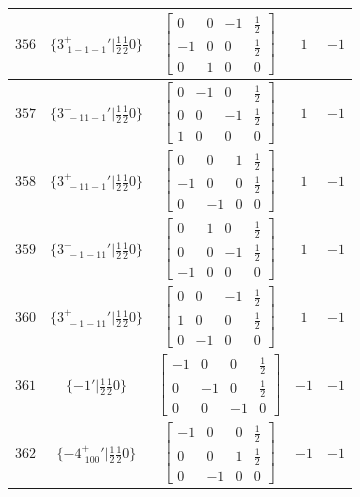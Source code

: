 \documentclass[fleqn,8pt]{jsarticle}
\begin{document}
\begin{longtable}{ccccc}
$ 356 $ & $ \{3^{+}_{\,\,1-1-1}{}'|\frac{1}{2} \frac{1}{2} 0\} $ & $ \begin{bmatrix} 0 & 0 & -1 & \frac{1}{2} \\ -1 & 0 & 0 & \frac{1}{2} \\ 0 & 1 & 0 & 0 \end{bmatrix} $ & $ 1 $ & $ -1 $ \\ \hline
$ 357 $ & $ \{3^{-}_{\,\,-11-1}{}'|\frac{1}{2} \frac{1}{2} 0\} $ & $ \begin{bmatrix} 0 & -1 & 0 & \frac{1}{2} \\ 0 & 0 & -1 & \frac{1}{2} \\ 1 & 0 & 0 & 0 \end{bmatrix} $ & $ 1 $ & $ -1 $ \\ \hline
$ 358 $ & $ \{3^{+}_{\,\,-11-1}{}'|\frac{1}{2} \frac{1}{2} 0\} $ & $ \begin{bmatrix} 0 & 0 & 1 & \frac{1}{2} \\ -1 & 0 & 0 & \frac{1}{2} \\ 0 & -1 & 0 & 0 \end{bmatrix} $ & $ 1 $ & $ -1 $ \\ \hline
$ 359 $ & $ \{3^{-}_{\,\,-1-11}{}'|\frac{1}{2} \frac{1}{2} 0\} $ & $ \begin{bmatrix} 0 & 1 & 0 & \frac{1}{2} \\ 0 & 0 & -1 & \frac{1}{2} \\ -1 & 0 & 0 & 0 \end{bmatrix} $ & $ 1 $ & $ -1 $ \\ \hline
$ 360 $ & $ \{3^{+}_{\,\,-1-11}{}'|\frac{1}{2} \frac{1}{2} 0\} $ & $ \begin{bmatrix} 0 & 0 & -1 & \frac{1}{2} \\ 1 & 0 & 0 & \frac{1}{2} \\ 0 & -1 & 0 & 0 \end{bmatrix} $ & $ 1 $ & $ -1 $ \\ \hline
$ 361 $ & $ \{-1{}'|\frac{1}{2} \frac{1}{2} 0\} $ & $ \begin{bmatrix} -1 & 0 & 0 & \frac{1}{2} \\ 0 & -1 & 0 & \frac{1}{2} \\ 0 & 0 & -1 & 0 \end{bmatrix} $ & $ -1 $ & $ -1 $ \\ \hline
$ 362 $ & $ \{-4^{+}_{\,\,100}{}'|\frac{1}{2} \frac{1}{2} 0\} $ & $ \begin{bmatrix} -1 & 0 & 0 & \frac{1}{2} \\ 0 & 0 & 1 & \frac{1}{2} \\ 0 & -1 & 0 & 0 \end{bmatrix} $ & $ -1 $ & $ -1 $ \\ \hline

\end{longtable}
\end{document}
